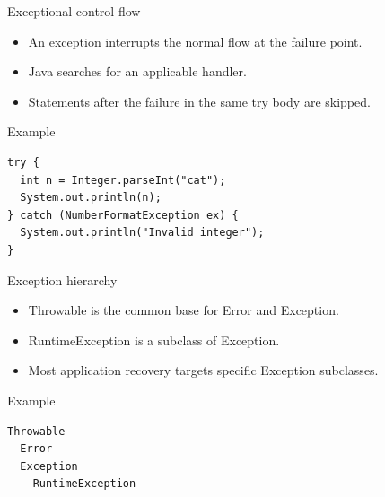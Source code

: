 \documentclass[10pt,aspectratio=169]{beamer}
\begin{document}
\begin{frame}[fragile,t]{Exceptional control flow}
\begin{itemize}
\item An exception interrupts the normal flow at the failure point.
\item Java searches for an applicable handler.
\item Statements after the failure in the same try body are skipped.
\end{itemize}
\vspace{1mm}\begin{block}{Example}
\begin{lstlisting}
try {
  int n = Integer.parseInt("cat");
  System.out.println(n);
} catch (NumberFormatException ex) {
  System.out.println("Invalid integer");
}
\end{lstlisting}
\end{block}
\end{frame}

\begin{frame}[fragile,t]{Exception hierarchy}
\begin{itemize}
\item Throwable is the common base for Error and Exception.
\item RuntimeException is a subclass of Exception.
\item Most application recovery targets specific Exception subclasses.
\end{itemize}
\vspace{1mm}\begin{block}{Example}
\begin{lstlisting}
Throwable
  Error
  Exception
    RuntimeException
\end{lstlisting}
\end{block}
\end{frame}
\end{document}
